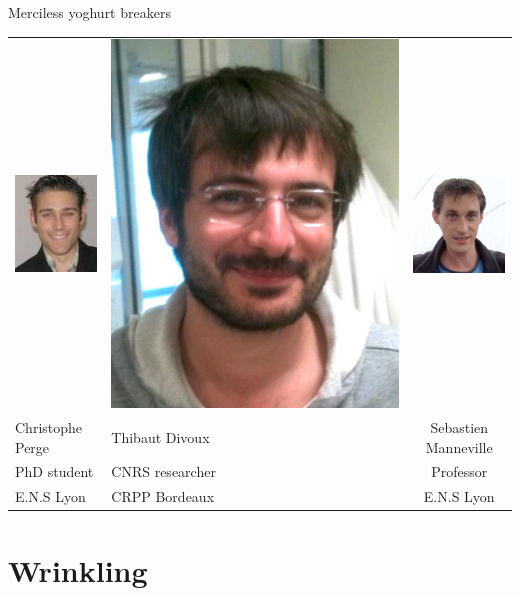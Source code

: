 \documentclass[xcolor=table]{beamer}
\begin{document}
\begin{frame}{Merciless yoghurt breakers}

\begin{tabu}{X[c]X[c]c}
\includegraphics[height=0.3\textheight]{Chris}&
\includegraphics[height=0.3\textheight]{Thibaut}&
\includegraphics[height=0.3\textheight]{Seb}\\
Christophe Perge & Thibaut Divoux & Sebastien Manneville\\
PhD student & CNRS researcher & Professor\\
E.N.S Lyon &  CRPP Bordeaux & E.N.S Lyon\\
\end{tabu}

\end{frame}


\section{Wrinkling}
\end{document}
